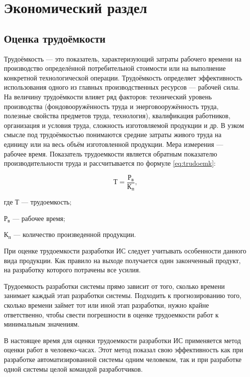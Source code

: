 \setcounter{section}{7}

\section{Экономический раздел}

\subsection{Оценка трудоёмкости	}

Трудоёмкость --- это  показатель, характеризующий затраты рабочего времени на производство определённой потребительной стоимости или на выполнение конкретной технологической операции\cite{marks}.
Трудоёмкость определяет эффективность использования одного из главных производственных ресурсов — рабочей силы. На величину трудоёмкости влияет ряд факторов: технический уровень производства (фондовооружённость труда и энерговооружённость труда, полезные свойства предметов труда, технология), квалификация работников, организация и условия труда, сложность изготовляемой продукции и др.
В узком смысле под трудоёмкостью понимаются средние затраты живого труда на единицу или на весь объём изготовленной продукции. Мера измерения --- рабочее время.
Показатель трудоемкости является обратным показателю производительности труда и рассчитывается по формуле \ref{eq:trudoemk}:

\begin{equation}
	\label{eq:trudoemk}
	Т = \frac{Р_{в}}{К_{п}},
\end{equation}
\begin{ESKDexplanation}
	\item где $Т$ --- трудоемкость;
	\item $Р_{в}$ --- рабочее время;
	\item $К_{п}$ --- количество произведенной продукции.
\end{ESKDexplanation}

При оценке трудоемкости разработки ИС следует учитывать особенности данного вида продукции.
Как правило на выходе получается один законченный продукт, на разработку которого потрачены все усилия.

Трудоемкость разработки системы прямо зависит от того, сколько времени занимает каждый этап разработки системы. Подходить к прогнозированию того, сколько времени займет тот или иной этап разработки, нужно крайне ответственно, чтобы свести погрешности в оценке трудоемкости работ к минимальным значениям.

В настоящее время для оценки трудоемкости разработки ИС применяется метод оценки работ в человеко-часах. Этот метод показал свою эффективность как при разработке автоматизированной системы одним человеком, так и при разработке одной системы целой командой разработчиков.

